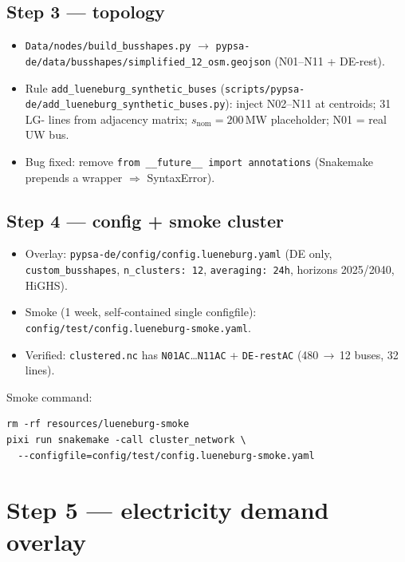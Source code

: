 \documentclass[11pt,a4paper]{article}
\begin{document}
\subsection{Step 3 --- topology}
\begin{itemize}[leftmargin=*]
  \item \texttt{Data/nodes/build\_busshapes.py} $\to$
        \texttt{pypsa-de/data/busshapes/simplified\_12\_osm.geojson}
        (N01--N11 + DE-rest).
  \item Rule \texttt{add\_lueneburg\_synthetic\_buses}
        (\texttt{scripts/pypsa-de/add\_lueneburg\_synthetic\_buses.py}):
        inject N02--N11 at centroids; 31 LG- lines from adjacency matrix;
        $s_\mathrm{nom}=200$\,MW placeholder; N01 = real UW bus.
  \item Bug fixed: remove \texttt{from \_\_future\_\_ import annotations}
        (Snakemake prepends a wrapper $\Rightarrow$ SyntaxError).
\end{itemize}

\subsection{Step 4 --- config + smoke cluster}
\begin{itemize}[leftmargin=*]
  \item Overlay: \texttt{pypsa-de/config/config.lueneburg.yaml}
        (DE only, \texttt{custom\_busshapes}, \texttt{n\_clusters: 12},
        \texttt{averaging: 24h}, horizons 2025/2040, HiGHS).
  \item Smoke (1 week, self-contained single configfile):
        \texttt{config/test/config.lueneburg-smoke.yaml}.
  \item Verified: \texttt{clustered.nc} has
        \texttt{N01AC}\ldots\texttt{N11AC} + \texttt{DE-restAC}
        (480\,$\to$\,12 buses, 32 lines).
\end{itemize}

Smoke command:
\begin{lstlisting}
rm -rf resources/lueneburg-smoke
pixi run snakemake -call cluster_network \
  --configfile=config/test/config.lueneburg-smoke.yaml
\end{lstlisting}

\section{Step 5 --- electricity demand overlay}
\end{document}
